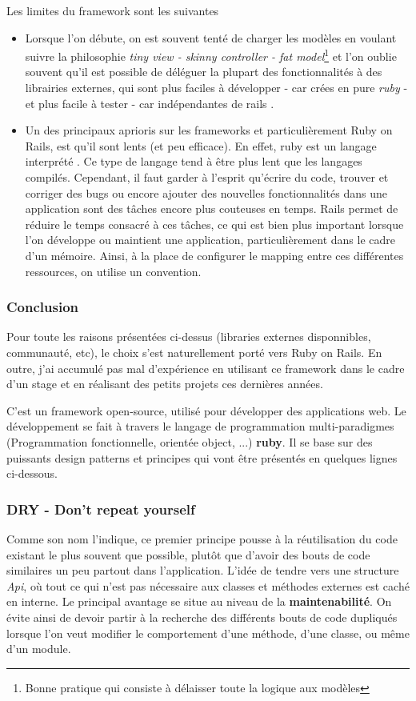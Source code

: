 Les limites du framework sont les suivantes
\begin{itemize}
\item Lorsque l'on débute, on est souvent tenté de charger les modèles en voulant suivre la philosophie \textit{tiny view - skinny controller - fat model}\footnote{Bonne pratique qui consiste à délaisser toute la logique aux modèles} et l'on oublie souvent qu'il est possible de déléguer la plupart des fonctionnalités à des librairies externes, qui sont plus faciles à développer - car crées en pure \textit{ruby} - et plus facile à tester - car indépendantes de rails \cite{fat_models}.

\item Un des principaux aprioris sur les frameworks et particulièrement Ruby on Rails, est qu'il sont lents (et peu efficace). En effet, ruby est un langage interprété . Ce type de langage tend à être plus lent que les langages compilés. Cependant, il faut garder à l'esprit qu'écrire du code, trouver et corriger des bugs ou encore ajouter des nouvelles fonctionnalités dans une application sont des tâches encore plus couteuses en temps. Rails permet de réduire le temps consacré à ces tâches, ce qui est bien plus important lorsque l'on développe ou maintient une application, particulièrement dans le cadre d'un mémoire. Ainsi, à la place de configurer le mapping entre ces différentes ressources, on utilise un convention.
\end{itemize}

\subsubsection{Conclusion}
Pour toute les raisons présentées ci-dessus (libraries externes disponnibles, communauté, etc), le choix s'est naturellement porté vers Ruby on Rails. En outre, j'ai accumulé pas mal d'expérience en utilisant ce framework dans le cadre d'un stage et en réalisant des petits projets ces dernières années. 

C'est un framework open-source, utilisé pour développer des applications web. Le développement se fait à travers le langage de programmation multi-paradigmes (Programmation fonctionnelle, orientée object, ...) \textbf{ruby}. Il se base sur des puissants design patterns et principes qui vont être présentés en quelques lignes ci-dessous.

\subsubsection{DRY - Don't repeat yourself}
Comme son nom l'indique, ce premier principe pousse à la réutilisation du code existant le plus souvent que possible, plutôt que d'avoir des bouts de code similaires un peu partout dans l'application. L'idée de tendre vers une structure \textit{Api}, où tout ce qui n'est pas nécessaire aux classes et méthodes externes est caché en interne. Le principal avantage se situe au niveau de la \textbf{maintenabilité}. On évite ainsi de devoir partir à la recherche des différents bouts de code dupliqués lorsque l'on veut modifier le comportement d'une méthode, d'une classe, ou même d'un module.

